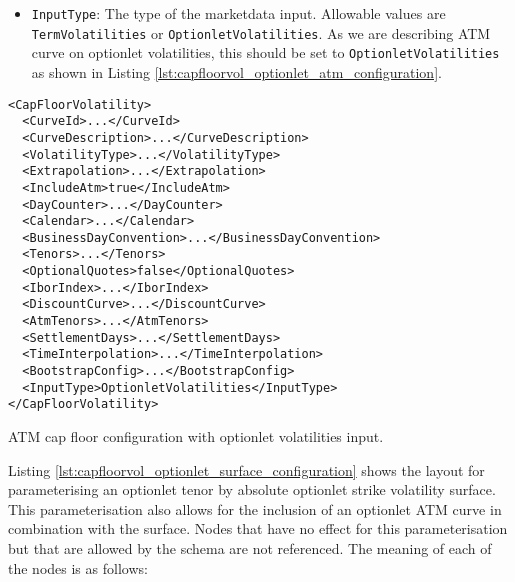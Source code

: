 \begin{itemize}
\item \lstinline!InputType!:
The type of the marketdata input. Allowable values are \lstinline!TermVolatilities! or \lstinline!OptionletVolatilities!. As we are describing ATM curve on optionlet volatilities, this should be set to \lstinline!OptionletVolatilities! as shown in Listing \ref{lst:capfloorvol_optionlet_atm_configuration}.

\end{itemize}

\begin{longlisting}
\begin{verbatim}
<CapFloorVolatility>
  <CurveId>...</CurveId>
  <CurveDescription>...</CurveDescription>
  <VolatilityType>...</VolatilityType>
  <Extrapolation>...</Extrapolation>
  <IncludeAtm>true</IncludeAtm>
  <DayCounter>...</DayCounter>
  <Calendar>...</Calendar>
  <BusinessDayConvention>...</BusinessDayConvention>
  <Tenors>...</Tenors>
  <OptionalQuotes>false</OptionalQuotes>
  <IborIndex>...</IborIndex>
  <DiscountCurve>...</DiscountCurve>
  <AtmTenors>...</AtmTenors>
  <SettlementDays>...</SettlementDays>
  <TimeInterpolation>...</TimeInterpolation>
  <BootstrapConfig>...</BootstrapConfig>
  <InputType>OptionletVolatilities</InputType>
</CapFloorVolatility>
\end{verbatim}
\caption{ATM cap floor configuration with optionlet volatilities input.}
\label{lst:capfloorvol_optionlet_atm_configuration}
\end{longlisting}

Listing \ref{lst:capfloorvol_optionlet_surface_configuration} shows the layout for parameterising an optionlet tenor by absolute optionlet strike volatility surface. This parameterisation also allows for the inclusion of an optionlet ATM curve in combination with the surface. Nodes that have no effect for this parameterisation but that are allowed by the schema are not referenced. The meaning of each of the nodes is as follows:

